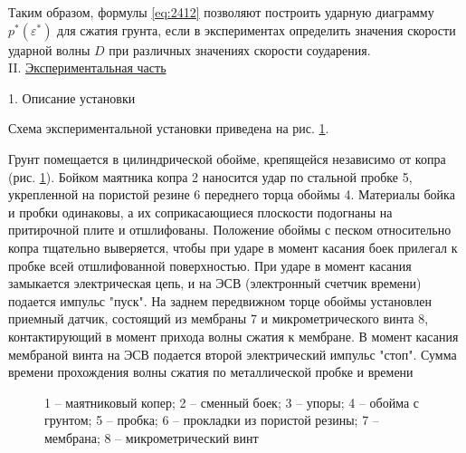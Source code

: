 \documentclass[specialist, subf, href, colorlinks=true, 14pt, final]{disser}
\theoremstyle{definition}
\newcommand{\npart}[2]{\noindent #1. \underline{#2}}
\begin{document}
Таким образом, формулы \eqref{eq:2412} позволяют построить ударную диаграмму $p^{*}(\varepsilon^{*})$ для сжатия грунта, если в экспериментах определить значения скорости ударной волны $D$ при различных значениях скорости соударения.\\

\npart{II}{Экспериментальная часть}

1. Описание установки

Схема экспериментальной установки приведена на рис. \ref{2-4-3}.

Грунт помещается в цилиндрической обойме, крепящейся независимо от копра (рис. \ref{2-4-3}). Бойком маятника копра 2 наносится удар по стальной пробке 5, укрепленной на пористой резине 6 переднего торца обоймы 4. Материалы бойка и пробки одинаковы, а их соприкасающиеся плоскости подогнаны на притирочной плите и отшлифованы. Положение обоймы с песком относительно копра тщательно выверяется, чтобы при ударе в момент касания боек прилегал к пробке всей отшлифованной поверхностью. При ударе в момент касания замыкается электрическая цепь, и на ЭСВ (электронный счетчик времени) подается импульс "пуск". На заднем передвижном торце обоймы установлен приемный датчик, состоящий из мембраны 7 и микрометрического винта 8, контактирующий в момент прихода волны сжатия к мембране. В момент касания мембраной винта на ЭСВ подается второй электрический импульс "стоп". Сумма  времени прохождения волны сжатия по металлической пробке и времени 
\begin{figure}[!htp]
  \caption{1 -- маятниковый копер; 2 -- сменный боек; 3 -- упоры; 4 -- обойма с грунтом; 5 -- пробка; 6 -- прокладки из пористой резины; 7 -- мембрана; 8 -- микрометрический винт}
  \label{2-4-3}
\end{figure}
\end{document}
